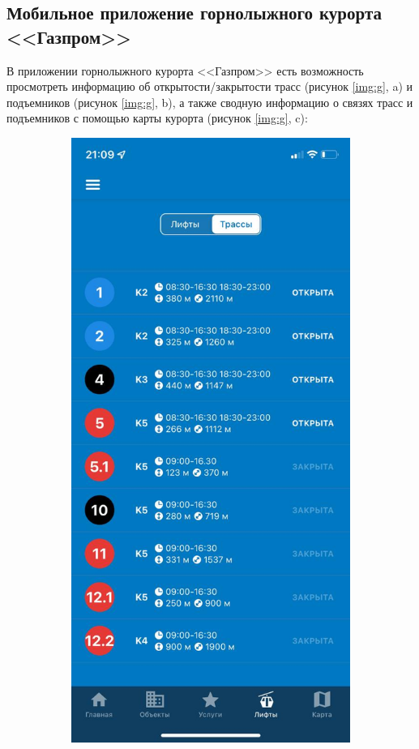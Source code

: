 \subsection{Мобильное приложение горнолыжного курорта <<Газпром>>}

В приложении горнолыжного курорта <<Газпром>> есть возможность просмотреть информацию об открытости/закрытости трасс (рисунок \ref{img:g}, a) и подъемников (рисунок \ref{img:g}, b), а также сводную информацию о связях трасс и подъемников с помощью карты курорта (рисунок \ref{img:g}, c):

\begin{figure}[h!]
	\begin{center}
	
	\begin{subfigure}{.33\textwidth}
		\centering
		\includegraphics[width=.95\linewidth]{../imgs/analogue_apps/gslope.png}

\end{subfigure}
\end{center}
\end{figure}
